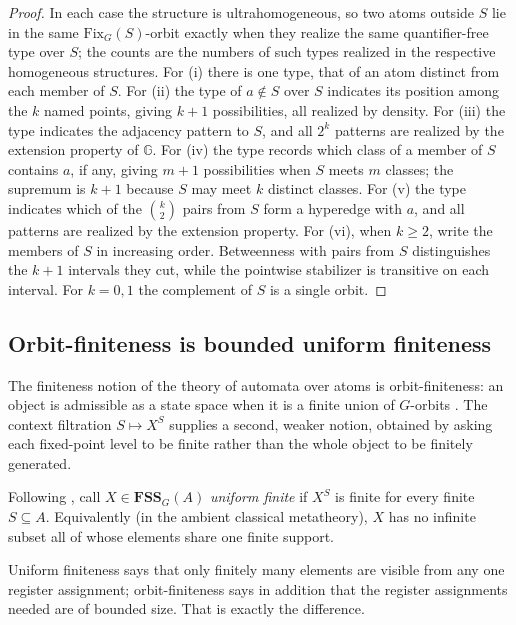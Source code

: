 \documentclass{lmcs}
\newcommand{\Fix}{\mathrm{Fix}}
\newcommand{\FSS}{\mathbf{FSS}}
\begin{document}
\begin{proof}
In each case the structure is ultrahomogeneous, so two atoms outside $S$
lie in the same $\Fix_G(S)$-orbit exactly when they realize the same
quantifier-free type over $S$; the counts are the numbers of such types
realized in the respective homogeneous structures. For (i) there is one
type, that of an atom distinct from each member of $S$. For (ii) the
type of $a\notin S$ over $S$ indicates its position among the $k$ named
points, giving $k+1$ possibilities, all realized by density. For (iii)
the type indicates the adjacency pattern to $S$, and all $2^k$ patterns are realized by the extension property of $\mathbb G$. For (iv) the type records which class of a member of $S$ contains $a$, if any, giving
$m+1$ possibilities when $S$ meets $m$ classes; the supremum is $k+1$
because $S$ may meet $k$ distinct classes. For (v) the type indicates
which of the $\binom k2$ pairs from $S$ form a hyperedge with $a$, and
all patterns are realized by the extension property. For (vi), when
$k\geq2$, write the members of $S$ in increasing order. Betweenness
with pairs from $S$ distinguishes the $k+1$ intervals they cut, while
the pointwise stabilizer is transitive on each interval. For $k=0,1$
the complement of $S$ is a single orbit.
\end{proof}

\subsection{Orbit-finiteness is bounded uniform finiteness}
\label{subsec:orbitfinite}

The finiteness notion of the theory of automata over atoms is
orbit-finiteness: an object is admissible as a state space when it is a
finite union of $G$-orbits \cite{BKL14}. The context filtration
$S\mapsto X^S$ supplies a second, weaker notion, obtained by asking each
fixed-point level to be finite rather than the whole object to be
finitely generated.

\begin{defi}\label{def:unifinite}
Following \cite{AC22}, call $X\in\FSS_G(A)$ \emph{uniform finite} if
$X^{S}$ is finite for every finite $S\subseteq A$. Equivalently (in
the ambient classical metatheory), $X$ has no infinite subset all of
whose elements share one finite support.
\end{defi}

Uniform finiteness says that only finitely many elements are visible
from any one register assignment; orbit-finiteness says in addition that
the register assignments needed are of bounded size. That is exactly
the difference.
\end{document}
